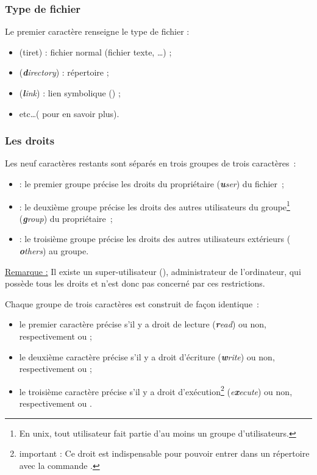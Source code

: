 \documentclass[11pt,a4paper]{article}
\begin{document}
\subsubsection*{Type de fichier}

Le premier caractère renseigne le type de fichier :
\begin{itemize}
 \item \cmd{-} (tiret) : fichier normal (fichier texte, \ldots) ;
 \item {} ({\em {\bf d}irectory}) : répertoire ;
 \item {} ({\em {\bf l}ink}) : lien symbolique () ;
 \item etc\ldots ( pour en savoir plus).
\end{itemize}


\subsubsection*{Les droits}

Les neuf caractères restants sont séparés en trois groupes
de trois caractères~:
\begin{itemize}
 \item {} : le premier groupe précise les droits du
                 propriétaire ({\em {\bf u}ser}) du fichier~;
 \item {} : le deuxième groupe précise les droits des
                 autres utilisateurs du groupe\footnote{En
                 {\sc unix}, tout utilisateur fait partie d'au moins 
                 un groupe d'utilisateurs.}
                 ({\em {\bf g}roup}) du propriétaire~;
 \item {} : le troisième groupe précise les droits des
                 autres utilisateurs extérieurs ({\em {\bf
                 o}thers}) au groupe.
\end{itemize}\noindent\underline{Remarque :} Il existe un super-utilisateur
(), administrateur de l'ordinateur, qui possède tous les
droits et n'est donc pas concerné par ces restrictions.

\bigskip

Chaque groupe de trois caractères est construit de façon identique~:
\begin{itemize}
 \item le premier caractère précise s'il y a droit de
       lecture ({\em {\bf r}ead}) ou non, respectivement  ou
       \cmd{-} ;
 \item le deuxième caractère précise s'il y a droit
       d'écriture ({\em {\bf w}rite}) ou non, respectivement
        ou \cmd{-} ;
 \item le troisième caractère précise s'il y a droit
       d'exécution\footnote{{\sc important :} Ce droit est
       indispensable pour pouvoir entrer dans un répertoire avec
       la commande .} ({\em e{\bf x}ecute}) ou non,
       respectivement  ou \cmd{-}.
\end{itemize}
\end{document}

